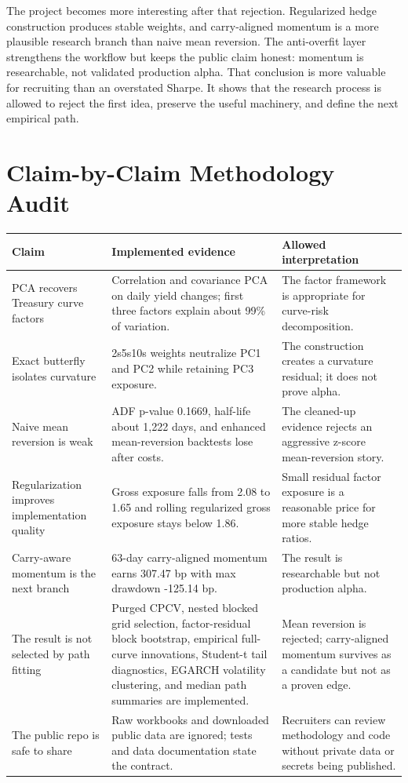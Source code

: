 \documentclass[12pt]{article}
\begin{document}
The project becomes more interesting after that rejection. Regularized hedge construction produces
stable weights, and carry-aligned momentum is a more plausible research branch than naive
mean reversion. The anti-overfit layer strengthens the workflow but keeps the public claim
honest: momentum is researchable, not validated production alpha. That conclusion is more
valuable for recruiting than an overstated Sharpe. It shows that the research process is allowed
to reject the first idea, preserve the useful machinery, and define the next empirical path.

\appendix
\section{Claim-by-Claim Methodology Audit}

\begin{center}
\small
\begin{tabular}{L{0.24\textwidth}L{0.31\textwidth}L{0.34\textwidth}}
\toprule
Claim & Implemented evidence & Allowed interpretation \\
\midrule
PCA recovers Treasury curve factors &
Correlation and covariance PCA on daily yield changes; first three factors explain about 99\%
of variation. &
The factor framework is appropriate for curve-risk decomposition. \\
\addlinespace
Exact butterfly isolates curvature &
2s5s10s weights neutralize PC1 and PC2 while retaining PC3 exposure. &
The construction creates a curvature residual; it does not prove alpha. \\
\addlinespace
Naive mean reversion is weak &
ADF p-value 0.1669, half-life about 1,222 days, and enhanced mean-reversion backtests lose
after costs. &
The cleaned-up evidence rejects an aggressive z-score mean-reversion story. \\
\addlinespace
Regularization improves implementation quality &
Gross exposure falls from 2.08 to 1.65 and rolling regularized gross exposure stays below 1.86. &
Small residual factor exposure is a reasonable price for more stable hedge ratios. \\
\addlinespace
Carry-aware momentum is the next branch &
63-day carry-aligned momentum earns 307.47 bp with max drawdown -125.14 bp. &
The result is researchable but not production alpha. \\
\addlinespace
The result is not selected by path fitting &
Purged CPCV, nested blocked grid selection, factor-residual block bootstrap, empirical full-curve
innovations, Student-t tail diagnostics, EGARCH volatility clustering, and median path summaries
are implemented. &
Mean reversion is rejected; carry-aligned momentum survives as a candidate but not as a proven
edge. \\
\addlinespace
The public repo is safe to share &
Raw workbooks and downloaded public data are ignored; tests and data documentation state the
contract. &
Recruiters can review methodology and code without private data or secrets being published. \\
\bottomrule
\end{tabular}
\end{center}
\end{document}

